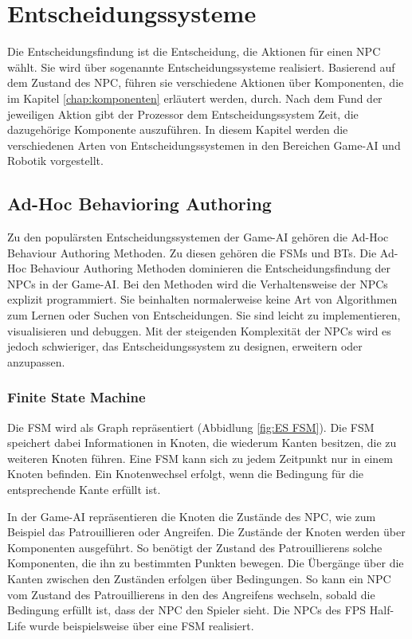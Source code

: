 \chapter{Entscheidungssysteme}
\label{chap:entscheidungssysteme}

Die Entscheidungsfindung ist die Entscheidung, die Aktionen f\"{u}r einen NPC w\"{a}hlt. Sie wird \"{u}ber sogenannte Entscheidungssysteme realisiert. Basierend auf dem Zustand des NPC, f\"{u}hren sie verschiedene Aktionen \"{u}ber Komponenten, die im Kapitel \ref{chap:komponenten} erläutert werden, durch. Nach dem Fund der jeweiligen Aktion gibt der Prozessor dem Entscheidungssystem Zeit, die dazugeh\"{o}rige Komponente auszuf\"{u}hren. In diesem Kapitel werden die verschiedenen Arten von Entscheidungssystemen in den Bereichen Game-AI und Robotik vorgestellt.

\section{Ad-Hoc Behavioring Authoring}
\label{chap:ahba}

Zu den popul\"{a}rsten Entscheidungssystemen der Game-AI geh\"{o}ren die Ad-Hoc Behaviour Authoring Methoden. Zu diesen geh\"{o}ren die FSMs und BTs. Die Ad-Hoc Behaviour Authoring Methoden dominieren die Entscheidungsfindung der NPCs in der Game-AI. Bei den Methoden wird die Verhaltensweise der NPCs explizit programmiert. Sie beinhalten normalerweise keine Art von Algorithmen zum Lernen oder Suchen von Entscheidungen. Sie sind leicht zu implementieren, visualisieren und debuggen. Mit der steigenden Komplexit\"{a}t der NPCs wird es jedoch schwieriger, das Entscheidungssystem zu designen, erweitern oder anzupassen. \autocite{aiag, review_game_ai}

\subsection{Finite State Machine}
\label{chap:fsm}

Die FSM wird als Graph repr\"{a}sentiert (Abbidlung \ref{fig:ES FSM}). Die FSM speichert dabei Informationen in Knoten, die wiederum Kanten besitzen, die zu weiteren Knoten f\"{u}hren. Eine FSM kann sich zu jedem Zeitpunkt nur in einem Knoten befinden. Ein Knotenwechsel erfolgt, wenn die Bedingung f\"{u}r die entsprechende Kante erf\"{u}llt ist. 

In der Game-AI repr\"{a}sentieren die Knoten die Zust\"{a}nde des NPC, wie zum Beispiel das Patrouillieren oder Angreifen. Die Zust\"{a}nde der Knoten werden \"{u}ber Komponenten ausgef\"{u}hrt. So ben\"{o}tigt der Zustand des Patrouillierens solche Komponenten, die ihn zu bestimmten Punkten bewegen. Die \"{U}berg\"{a}nge \"{u}ber die Kanten zwischen den Zust\"{a}nden erfolgen \"{u}ber Bedingungen. So kann ein NPC vom Zustand des Patrouillierens in den des Angreifens wechseln, sobald die Bedingung erf\"{u}llt ist, dass der NPC den Spieler sieht. Die NPCs des FPS Half-Life wurde beispielsweise \"{u}ber eine FSM realisiert. \autocite{AIgames}

